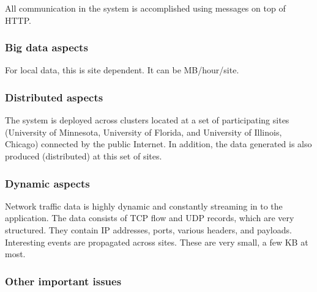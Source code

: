 All communication in the system is accomplished using messages on top of HTTP.

 \subsubsection*{Big data aspects}



For local data, this is site dependent. It can be MB/hour/site.

 \subsubsection*{Distributed aspects}



The system is deployed across clusters
located  at a set of participating sites (University of Minnesota, University of Florida, and University of Illinois, Chicago) connected by the public Internet. In addition, the data generated is also produced (distributed) at this set of sites.

 \subsubsection*{Dynamic aspects}



Network traffic data is highly dynamic and constantly streaming in to the application. The data consists of TCP flow and UDP records, which are very structured.  They contain IP addresses, ports, various headers, and payloads. Interesting events are propagated across sites. These are very small, a few KB at most.


 \subsubsection*{Other important issues}


